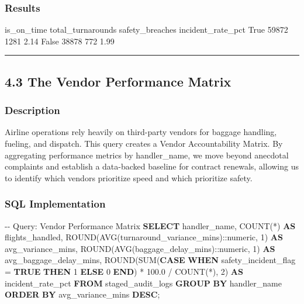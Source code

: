 \documentclass[
  letterpaper,
  DIV=11,
  numbers=noendperiod]{scrartcl}
\newenvironment{Shaded}{\begin{snugshade}}{\end{snugshade}}
\newcommand{\CharTok}[1]{\textcolor[rgb]{0.13,0.47,0.30}{#1}}
\newcommand{\CommentTok}[1]{\textcolor[rgb]{0.37,0.37,0.37}{#1}}
\newcommand{\ControlFlowTok}[1]{\textcolor[rgb]{0.00,0.23,0.31}{\textbf{#1}}}
\newcommand{\DecValTok}[1]{\textcolor[rgb]{0.68,0.00,0.00}{#1}}
\newcommand{\FloatTok}[1]{\textcolor[rgb]{0.68,0.00,0.00}{#1}}
\newcommand{\FunctionTok}[1]{\textcolor[rgb]{0.28,0.35,0.67}{#1}}
\newcommand{\KeywordTok}[1]{\textcolor[rgb]{0.00,0.23,0.31}{\textbf{#1}}}
\newcommand{\NormalTok}[1]{\textcolor[rgb]{0.00,0.23,0.31}{#1}}
\newcommand{\OperatorTok}[1]{\textcolor[rgb]{0.37,0.37,0.37}{#1}}
\begin{document}
\subsubsection{Results}

is\_on\_time total\_turnarounds safety\_breaches incident\_rate\_pct
True 59872 1281 2.14 False 38878 772 1.99

\begin{center}\rule{0.5\linewidth}{0.5pt}\end{center}

\subsection{4.3 The Vendor Performance
Matrix}\label{the-vendor-performance-matrix}

\subsubsection{Description}

Airline operations rely heavily on third-party vendors for baggage
handling, fueling, and dispatch. This query creates a Vendor
Accountability Matrix. By aggregating performance metrics by
handler\_name, we move beyond anecdotal complaints and establish a
data-backed baseline for contract renewals, allowing us to identify
which vendors prioritize speed and which prioritize safety.

\subsubsection{SQL Implementation}

\begin{Shaded}
\begin{Highlighting}[]
\CommentTok{{-}{-} Query: Vendor Performance Matrix}
\KeywordTok{SELECT} 
\NormalTok{    handler\_name,}
    \FunctionTok{COUNT}\NormalTok{(}\OperatorTok{*}\NormalTok{) }\KeywordTok{AS}\NormalTok{ flights\_handled,}
    \FunctionTok{ROUND}\NormalTok{(}\FunctionTok{AVG}\NormalTok{(turnaround\_variance\_mins):}\CharTok{:numeric}\NormalTok{, }\DecValTok{1}\NormalTok{) }\KeywordTok{AS}\NormalTok{ avg\_variance\_mins,}
    \FunctionTok{ROUND}\NormalTok{(}\FunctionTok{AVG}\NormalTok{(baggage\_delay\_mins):}\CharTok{:numeric}\NormalTok{, }\DecValTok{1}\NormalTok{) }\KeywordTok{AS}\NormalTok{ avg\_baggage\_delay\_mins,}
    \FunctionTok{ROUND}\NormalTok{(}\FunctionTok{SUM}\NormalTok{(}\ControlFlowTok{CASE} \ControlFlowTok{WHEN}\NormalTok{ safety\_incident\_flag }\OperatorTok{=} \KeywordTok{TRUE} \ControlFlowTok{THEN} \DecValTok{1} \ControlFlowTok{ELSE} \DecValTok{0} \ControlFlowTok{END}\NormalTok{) }\OperatorTok{*} \FloatTok{100.0} \OperatorTok{/} \FunctionTok{COUNT}\NormalTok{(}\OperatorTok{*}\NormalTok{), }\DecValTok{2}\NormalTok{) }\KeywordTok{AS}\NormalTok{ incident\_rate\_pct}
\KeywordTok{FROM}\NormalTok{ staged\_audit\_logs}
\KeywordTok{GROUP} \KeywordTok{BY}\NormalTok{ handler\_name}
\KeywordTok{ORDER} \KeywordTok{BY}\NormalTok{ avg\_variance\_mins }\KeywordTok{DESC}\NormalTok{;}
\end{Highlighting}
\end{Shaded}
\end{document}
